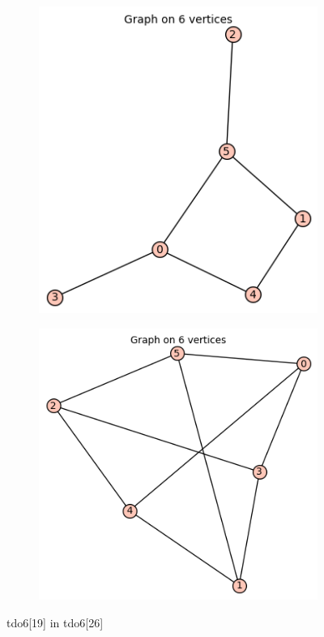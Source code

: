 \documentclass[12pt, a4paper]{article}
\begin{document}
\begin{center}
\begin{figure}[!htb]
\centering
\begin{subfigure}{0.5\textwidth}
  \centering
  \includegraphics[width=0.5\linewidth]{tdo6[19]}
\end{subfigure}%
\begin{subfigure}{0.5\textwidth}
  \centering
  \includegraphics[width=0.5\linewidth]{tdo6[26]}
\end{subfigure}
\caption{tdo6[19] in tdo6[26]}
\label{fig:test}
\end{figure}


\end{center}
\end{document}
